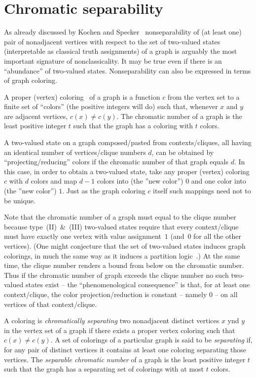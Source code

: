 \documentclass[%
  reprint,
  twocolumn,
 showpacs,
 showkeys,
 preprintnumbers,
 amsmath,amssymb,
 aps,
  prl,
  longbibliography,
 ]{revtex4-1}
\begin{document}
\section{Chromatic separability}

As already discussed by Kochen and Specker~\cite[Theorem~0]{kochen1}
nonseparability of (at least one) pair of nonadjacent vertices
with respect to the set of two-valued states
(interpretable as classical truth assignments) of a graph
is arguably the most important signature of nonclassicality.
It may be true even if there is an ``abundance'' of two-valued states.
Nonseparability can also be expressed in terms of graph coloring.

 A proper (vertex)
coloring~\cite[Appendix]{Godsil-Newman-2008} of a graph is a function $c$ from the vertex set to a finite
set of ``colors'' (the positive integers will do) such that,
whenever $x$ and $y$ are adjacent vertices,
$c(x) \neq c(y)$.
The chromatic number of a graph  is the least positive integer $t$ such
that the graph has a coloring with $t$ colors.


A two-valued state on a graph composed/pasted from contexts/cliques,
all having an identical
number of vertices/clique numbers $d$, can be obtained by ``projecting/reducing'' colors
if the chromatic number of that graph equals $d$.
In this case, in order to obtain a two-valued state,
take any proper (vertex) coloring $c$ with $d$ colors
and  map $d-1$ colors into (the ''new color'') $0$ and one color into (the ''new color'') $1$.
Just as the graph coloring $c$ itself such mappings need not to be unique.

Note that the chromatic number of a graph must equal to the clique number
because type~(II)~{\&}~(III) two-valued states require that every context/clique
must have exactly one vertex with value assignment~$1$ (and~$0$ for all the other vertices).
(One might conjecture that the set of two-valued states
induces graph colorings, in much the same way as it induces a partition logic~\cite{svozil-2001-eua}.)
At the same time, the clique number renders a bound from below on the chromatic number.
Thus if the chromatic number of graph exceeds the clique number
no such two-valued states exist -- the ``phenomenological consequence'' is that, for at least one context/clique,
the color projection/reduction is constant -- namely $0$ -- on all vertices of that context/clique.



A coloring is {\em chromatically separating} two nonadjacent distinct vertices $x$ ynd $y$ in the vertex set of a graph
if there exists a proper vertex coloring such that $c(x) \neq c(y)$.
A set of colorings of a particular graph is said to be {\em separating}
if, for any pair of distinct vertices it contains at least one coloring  separating those vertices.
The {\em separable chromatic number} of a graph is the least positive integer $t$ such
that the graph has a separating set of colorings with at most $t$ colors.
\end{document}
